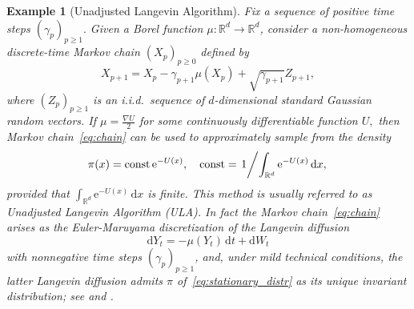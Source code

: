 \documentclass[preprint]{imsart}
\def\rmd{\mathrm{d}}
\def\rme{\mathrm{e}}
\newtheorem{example}{Example}
\begin{document}
\begin{example}[Unadjusted Langevin Algorithm]
\label{exam:langevin-algorithm}
Fix a sequence of positive time steps \((\gamma_p)_{p\geq 1}.\) Given a Borel function $\mu\colon\mathbb{R}^{d}\to\mathbb{R}^{d}$,
consider a non-homogeneous
discrete-time Markov chain $(X_{p})_{p\geq0}$ defined by
\begin{equation}\label{eq:chain}
X_{p+1}=X_{p}-\gamma_{p+1}\mu(X_{p})+\sqrt{\gamma_{p+1}}Z_{p+1},\end{equation}
where $\left(Z_{p}\right)_{p\geq1}$ is an i.i.d.\ sequence of $d$-dimensional
standard Gaussian random vectors. If
${\mu=\frac{\nabla U}{2}}$
for some continuously differentiable function $U,$ then Markov chain~\eqref{eq:chain} can be used to approximately sample from the density
\begin{equation}\label{eq:stationary_distr}
\pi(x)= \mathrm{const}\,\rme^{-U(x)}, \quad \mathrm{const}= \left. 1 \middle /{\int_{\mathbb{R}^{d}} \rme^{-U(x)}\, \rmd x,} \right.
\end{equation}
provided that \(\int_{\mathbb{R}^{d}} \rme^{-U(x)}\,\rmd x\) is finite. This method is usually referred to as
Unadjusted Langevin Algorithm (ULA).
In fact the Markov chain~\eqref{eq:chain}
arises as the Euler-Maruyama discretization
of the Langevin diffusion
\[
\rmd Y_t=-\mu(Y_t)\,\rmd t+ \rmd W_t
\]
with nonnegative time steps $(\gamma_p)_{p\ge1}$,
and,  under mild technical conditions, the latter Langevin diffusion admits $\pi$
of~\eqref{eq:stationary_distr}
as its unique invariant distribution; see \cite{dalalyan2017theoretical} and \cite{durmus:moulines:2017}.
\end{example}
\end{document}
